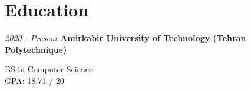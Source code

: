 
\section{Education}




\begin{twocolentry}{\textit{2020 - Present}}
	\textbf{Amirkabir University of Technology (Tehran Polytechnique)}
	
	BS in Computer Science
	\\
	GPA: 18.71 / 20
\end{twocolentry}
